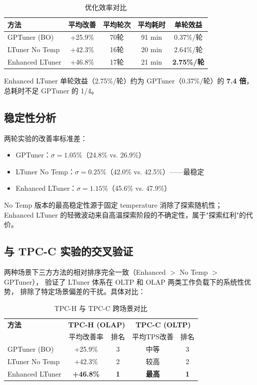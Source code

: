 \begin{table}[h]
\centering
\caption{优化效率对比}
\label{tab:tpch-efficiency}
\begin{tabular}{l|cccc}
\hline
\textbf{方法} & \textbf{平均改善} & \textbf{平均轮次} & \textbf{平均耗时} & \textbf{单轮效益} \\
\hline
GPTuner (BO)    & +25.9\% & 70轮 & 91 min & 0.37\%/轮 \\
LTuner No Temp  & +42.3\% & 16轮 & 20 min & 2.64\%/轮 \\
Enhanced LTuner & +46.8\% & 17轮 & 21 min & \textbf{2.75\%/轮} \\
\hline
\end{tabular}
\end{table}

Enhanced LTuner 单轮效益（2.75\%/轮）约为 GPTuner（0.37\%/轮）的 \textbf{7.4 倍}，
总耗时不足 GPTuner 的 1/4。

\subsection{稳定性分析}

两轮实验的改善率标准差：
\begin{itemize}
  \item GPTuner：$\sigma = 1.05\%$（24.8\% vs. 26.9\%）
  \item LTuner No Temp：$\sigma = 0.25\%$（42.0\% vs. 42.5\%）——最稳定
  \item Enhanced LTuner：$\sigma = 1.15\%$（45.6\% vs. 47.9\%）
\end{itemize}

No Temp 版本的最高稳定性源于固定 temperature 消除了探索随机性；
Enhanced LTuner 的轻微波动来自高温探索阶段的不确定性，属于"探索红利"的代价。

\subsection{与 TPC-C 实验的交叉验证}

两种场景下三方方法的相对排序完全一致（Enhanced $>$ No Temp $>$ GPTuner），
验证了 LTuner 体系在 OLTP 和 OLAP 两类工作负载下的系统性优势，
排除了特定场景偏差的干扰。具体对比：

\begin{table}[h]
\centering
\caption{TPC-H 与 TPC-C 跨场景对比}
\label{tab:cross-benchmark}
\begin{tabular}{l|cc|cc}
\hline
\textbf{方法} & \multicolumn{2}{c|}{\textbf{TPC-H (OLAP)}} & \multicolumn{2}{c}{\textbf{TPC-C (OLTP)}} \\
              & 平均改善率 & 排名 & 平均TPS改善 & 排名 \\
\hline
GPTuner (BO)    & +25.9\% & 3 & 中等 & 3 \\
LTuner No Temp  & +42.3\% & 2 & 较高 & 2 \\
Enhanced LTuner & \textbf{+46.8\%} & \textbf{1} & \textbf{最高} & \textbf{1} \\
\hline
\end{tabular}
\end{table}


